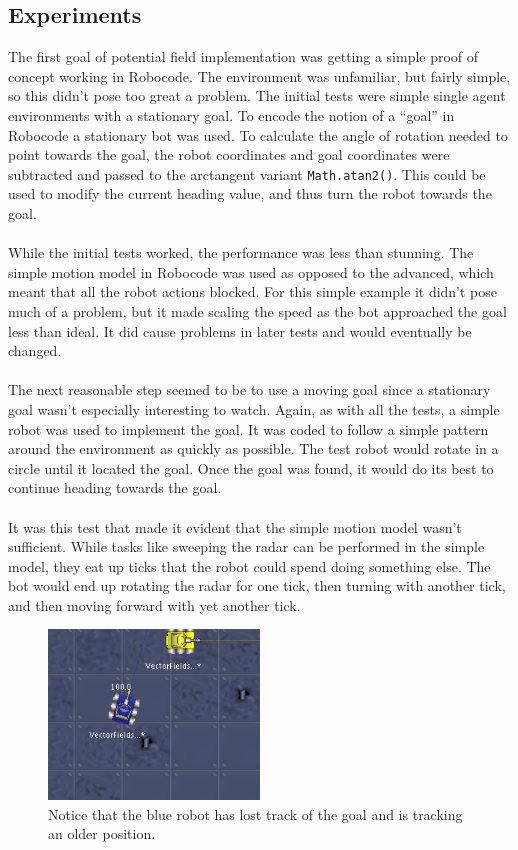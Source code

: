 \documentclass{aiaa-tc}%
\begin{document}
\subsection{Experiments}
The first goal of potential field implementation was getting a simple proof of concept working in Robocode. The environment was unfamiliar, but fairly simple, so this didn't pose too great a problem. The initial tests were simple single agent environments with a stationary goal. To encode the notion of a ``goal'' in Robocode a stationary bot was used. To calculate the angle of rotation needed to point towards the goal, the robot coordinates and goal coordinates were subtracted and passed to the arctangent variant \verb|Math.atan2()|. This could be used to modify the current heading value, and thus turn the robot towards the goal. \\ \\
While the initial tests worked, the performance was less than stunning. The simple motion model in Robocode was used as opposed to the advanced, which meant that all the robot actions blocked. For this simple example it didn't pose much of a problem, but it made scaling the speed as the bot approached the goal less than ideal. It did cause problems in later tests and would eventually be changed. \\ \\
The next reasonable step seemed to be to use a moving goal since a stationary goal wasn't especially interesting to watch. Again, as with all the tests, a simple robot was used to implement the goal. It was coded to follow a simple pattern around the environment as quickly as possible. The test robot would rotate in a circle until it located the goal. Once the goal was found, it would do its best to continue heading towards the goal.  \\ \\
It was this test that made it evident that the simple motion model wasn't sufficient. While tasks like sweeping the radar can be performed in the simple model, they eat up ticks that the robot could spend doing something else. The bot would end up rotating the radar for one tick, then turning with another tick, and then moving forward with yet another tick. 
\begin{figure}[htb]
\centering
\includegraphics[width=0.5\textwidth]{images/SimpleRadarFailure}
\caption{Notice that the blue robot has lost track of the goal and is tracking an older position.}
\end{figure} \\
\end{document}
